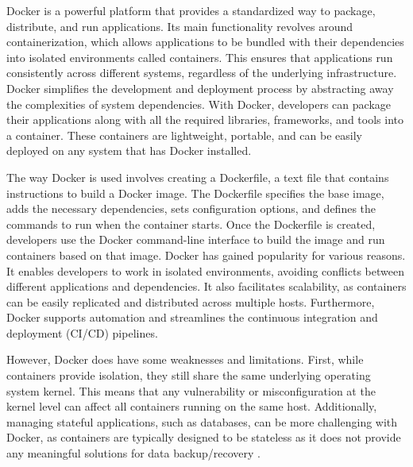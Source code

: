 \documentclass[a4paper, 11pt]{report}
\begin{document}
Docker is a powerful platform that provides a standardized way to package, distribute, and run applications. Its main functionality revolves around containerization, which allows applications to be bundled with their dependencies into isolated environments called containers.  \cite{infoworld}  This ensures that applications run consistently across different systems, regardless of the underlying infrastructure. Docker simplifies the development and deployment process by abstracting away the complexities of system dependencies. With Docker, developers can package their applications along with all the required libraries, frameworks, and tools into a container. These containers are lightweight, portable, and can be easily deployed on any system that has Docker installed. 

\cite{docker}  The way Docker is used involves creating a Dockerfile, a text file that contains instructions to build a Docker image. The Dockerfile specifies the base image, adds the necessary dependencies, sets configuration options, and defines the commands to run when the container starts. Once the Dockerfile is created, developers use the Docker command-line interface to build the image and run containers based on that image. Docker has gained popularity for various reasons. It enables developers to work in isolated environments, avoiding conflicts between different applications and dependencies. It also facilitates scalability, as containers can be easily replicated and distributed across multiple hosts. Furthermore, Docker supports automation and streamlines the continuous integration and deployment (CI/CD) pipelines. 

However, Docker does have some weaknesses and limitations. First, while containers provide isolation, they still share the same underlying operating system kernel. This means that any vulnerability or misconfiguration at the kernel level can affect all containers running on the same host. Additionally, managing stateful applications, such as databases, can be more challenging with Docker, as containers are typically designed to be stateless as it does not provide any meaningful solutions for data backup/recovery  \cite{linkedin}.
\end{document}
